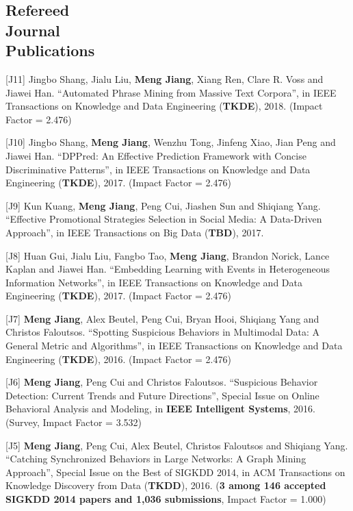\documentclass[margin, 9pt]{res}
\begin{document}
\begin{resume}

\section{Refereed \\ Journal \\ Publications}

[J11] Jingbo Shang, Jialu Liu, \textbf{Meng Jiang}, Xiang Ren, Clare R. Voss and Jiawei Han. ``Automated Phrase Mining from Massive Text Corpora'', in IEEE Transactions on Knowledge and Data Engineering (\textbf{TKDE}), 2018. (Impact Factor = 2.476)

[J10] Jingbo Shang, \textbf{Meng Jiang}, Wenzhu Tong, Jinfeng Xiao, Jian Peng and Jiawei Han. ``DPPred: An Effective Prediction Framework with Concise Discriminative Patterns'', in IEEE Transactions on Knowledge and Data Engineering (\textbf{TKDE}), 2017. (Impact Factor = 2.476)

[J9] Kun Kuang, \textbf{Meng Jiang}, Peng Cui, Jiashen Sun and Shiqiang Yang. ``Effective Promotional Strategies Selection in Social Media: A Data-Driven Approach'', in IEEE Transactions on Big Data (\textbf{TBD}), 2017.

[J8] Huan Gui, Jialu Liu, Fangbo Tao, \textbf{Meng Jiang}, Brandon Norick, Lance Kaplan and Jiawei Han. ``Embedding Learning with Events in Heterogeneous Information Networks'', in IEEE Transactions on Knowledge and Data Engineering (\textbf{TKDE}), 2017. (Impact Factor = 2.476)

[J7] \textbf{Meng Jiang}, Alex Beutel, Peng Cui, Bryan Hooi, Shiqiang Yang and Christos Faloutsos. ``Spotting Suspicious Behaviors in Multimodal Data: A General Metric and Algorithms'', in IEEE Transactions on Knowledge and Data Engineering (\textbf{TKDE}), 2016. (Impact Factor = 2.476)

[J6] \textbf{Meng Jiang}, Peng Cui and Christos Faloutsos. ``Suspicious Behavior Detection: Current Trends and Future Directions'', Special Issue on Online Behavioral Analysis and Modeling, in \textbf{IEEE Intelligent Systems}, 2016. (Survey, Impact Factor = 3.532)

[J5] \textbf{Meng Jiang}, Peng Cui, Alex Beutel, Christos Faloutsos and Shiqiang Yang. ``Catching Synchronized Behaviors in Large Networks: A Graph Mining Approach'', Special Issue on the Best of SIGKDD 2014, in ACM Transactions on Knowledge Discovery from Data (\textbf{TKDD}), 2016. (\textbf{3 among 146 accepted SIGKDD 2014 papers and 1,036 submissions}, Impact Factor = 1.000)


\end{resume}
\end{document}
